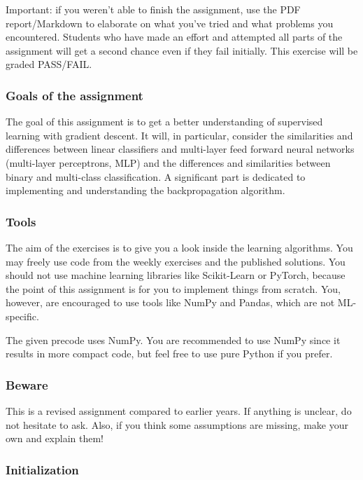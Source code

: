 \documentclass[11pt]{article}
\begin{document}
Important: if you weren't able to finish the assignment, use the PDF
report/Markdown to elaborate on what you've tried and what problems you
encountered. Students who have made an effort and attempted all parts of
the assignment will get a second chance even if they fail initially.
This exercise will be graded PASS/FAIL.

    \hypertarget{goals-of-the-assignment}{%
\subsubsection{Goals of the assignment}\label{goals-of-the-assignment}}

The goal of this assignment is to get a better understanding of
supervised learning with gradient descent. It will, in particular,
consider the similarities and differences between linear classifiers and
multi-layer feed forward neural networks (multi-layer perceptrons, MLP)
and the differences and similarities between binary and multi-class
classification. A significant part is dedicated to implementing and
understanding the backpropagation algorithm.

\hypertarget{tools}{%
\subsubsection{Tools}\label{tools}}

The aim of the exercises is to give you a look inside the learning
algorithms. You may freely use code from the weekly exercises and the
published solutions. You should not use machine learning libraries like
Scikit-Learn or PyTorch, because the point of this assignment is for you
to implement things from scratch. You, however, are encouraged to use
tools like NumPy and Pandas, which are not ML-specific.

The given precode uses NumPy. You are recommended to use NumPy since it
results in more compact code, but feel free to use pure Python if you
prefer.

\hypertarget{beware}{%
\subsubsection{Beware}\label{beware}}

This is a revised assignment compared to earlier years. If anything is
unclear, do not hesitate to ask. Also, if you think some assumptions are
missing, make your own and explain them!

    \hypertarget{initialization}{%
\subsubsection{Initialization}\label{initialization}}
\end{document}
